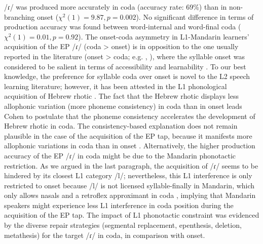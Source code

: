 \documentclass[output=paper]{../langscibook}
\begin{document}
/ɾ/ was produced more accurately in coda (accuracy rate: 69\%) than in non-branching onset ($\chi^2(1) = 9.87, p=0.002$). No significant difference in terms of production accuracy was found between word-internal and word-final coda ($\chi^2(1) = 0.01, p=0.92$). The onset-coda asymmetry in L1-Mandarin learners’ acquisition of the EP /ɾ/ (coda > onset) is in opposition to the one usually reported in the literature (onset > coda; e.g. \citealt{ColantoniSteele2008}, \citealt{Waltmunson2005}), where the syllable onset was considered to be salient in terms of accessibility and learnability \citep{Carlisle1998}. To our best knowledge, the preference for syllable coda over onset is novel to the L2 speech learning literature; however, it has been attested in the L1 phonological acquisition of Hebrew rhotic \citep{Cohen2015}. The fact that the Hebrew rhotic displays less allophonic variation (more phoneme consistency) in coda than in onset leads Cohen to postulate that the phoneme consistency accelerates the development of Hebrew rhotic in coda. The consistency-based explanation does not remain plausible in the case of the acquisition of the EP tap, because it manifests more allophonic variations in coda than in onset \citep{Silva2014}. Alternatively, the higher production accuracy of the EP /ɾ/ in coda might be due to the Mandarin phonotactic restriction. As we argued in the last paragraph, the acquisition of /ɾ/ seems to be hindered by its closest L1 category /l/; nevertheless, this L1 interference is only restricted to onset because /l/ is not licensed syllable-finally in Mandarin, which only allows nasals and a retroflex approximant in coda \citep{Lin2007}, implying that Mandarin speakers might experience less L1 interference in coda position during the acquisition of the EP tap. The impact of L1 phonotactic constraint was evidenced by the diverse repair strategies (segmental replacement, epenthesis, deletion, metathesis) for the target /ɾ/ in coda, in comparison with onset.
\end{document}
